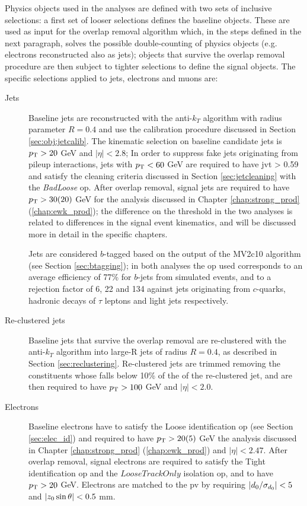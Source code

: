 Physics objects used in the analyses are defined with two sets of inclusive selections:
a first set of looser selections defines the baseline objects. 
These are used as input for the overlap removal algorithm which, in the steps defined in the next paragraph,
solves the possible double-counting of physics objects (e.g. electrons reconstructed also as jets); objects that survive the overlap removal procedure are then subject to 
tighter selections to define the signal objects. The specific selections applied to jets, electrons and muons are:

\begin{description}

\item[Jets] Baseline jets are reconstructed with the anti-$k_T$ algorithm 
with radius parameter $R=0.4$ 
and use the calibration procedure discussed in Section \ref{sec:obj:jetcalib}. 
The kinematic selection on baseline candidate jets is  $p_{\rm T} > 20$ GeV and $|\eta|<2.8$; 
In order to suppress fake jets originating from pileup interactions, jets with $p_{\rm T}<60$ GeV are required to have \gls{jvt} > 0.59 and satisfy the cleaning criteria discussed in Section \ref{sec:jetcleaning} with the \textit{BadLoose} \gls{op}.
After overlap removal, signal jets are required to have $p_{\rm T}>30 (20)$ GeV for the analysis discussed in Chapter \ref{chap:strong_prod} (\ref{chap:ewk_prod}); the difference on the \pt threshold 
in the two analyses is related to differences in the signal event kinematics, and will be discussed more in detail in the specific chapters.

Jets are considered $b$-tagged based on the output of the MV2c10 algorithm (see Section \ref{sec:btagging}); in both analyses the \gls{op} used corresponds to an average efficiency of 77\% for $b$-jets from simulated  
\ttbar events, and to a rejection factor of 6, 22 and 134 against jets originating from $c$-quarks, hadronic decays of $\tau$ leptons and light jets respectively. 


\item[Re-clustered jets] Baseline jets that survive the overlap removal are re-clustered with the anti-$k_T$ algorithm into large-R jets of radius $R=0.4$, as described in Section \ref{sec:reclustering}. 
Re-clustered jets are trimmed removing the constituents whose \pt falls below 10\% of the \pt of the re-clustered jet, and are then required to have $p_{\rm T}>100$ GeV and $|\eta|<2.0$.

\item[Electrons] Baseline electrons have to satisfy the Loose identification \gls{op} (see Section \ref{sec:elec_id}) and required to have $p_{\rm T} > 20 (5)$ GeV the analysis discussed in Chapter \ref{chap:strong_prod} (\ref{chap:ewk_prod}) and $|\eta|<2.47$. 
After overlap removal, signal electrons are required to satisfy the Tight identification \gls{op} and the $LooseTrackOnly$ isolation \gls{op}, and  to have $p_{\rm T} > 20$ GeV.
Electrons are matched to the \gls{pv} by requiring $|{d_0}/\sigma_{d_0}| < 5$ and  $|{z_0} \sin\theta| < 0.5$ mm.



\end{description}
